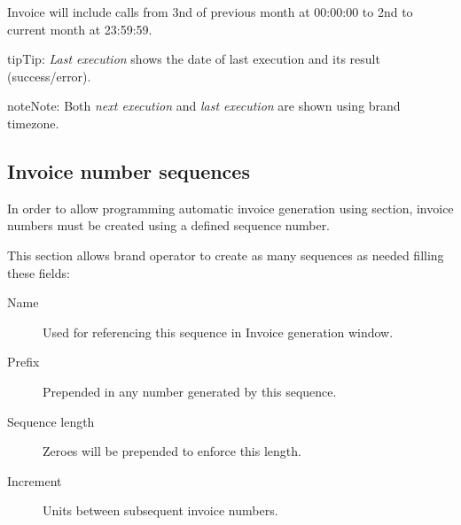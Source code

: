 \documentclass[letterpaper,10pt,english]{sphinxmanual}
\begin{document}
Invoice will include calls from 3nd of previous month at 00:00:00 to 2nd to current month at 23:59:59.

\begin{notice}{tip}{Tip:}
\emph{Last execution} shows the date of last execution and its result (success/error).
\end{notice}

\begin{notice}{note}{Note:}
Both \emph{next execution} and \emph{last execution} are shown using brand timezone.
\end{notice}


\subsection{Invoice number sequences}
\label{administration_portal/brand/invoicing/invoice_number_sequences:invoice-number-sequences}\label{administration_portal/brand/invoicing/invoice_number_sequences::doc}
In order to allow programming automatic invoice generation using {\hyperref[administration_portal/brand/invoicing/invoice_schedulers:invoice\string-schedulers]{}} section, invoice
numbers must be created using a defined sequence number.

This section allows brand operator to create as many sequences as needed filling these fields:
\begin{description}
\item[{Name}] \leavevmode{}\label{administration_portal/brand/invoicing/invoice_number_sequences:term-name}
Used for referencing this sequence in Invoice generation window.

\item[{Prefix}] \leavevmode{}\label{administration_portal/brand/invoicing/invoice_number_sequences:term-prefix}
Prepended in any number generated by this sequence.

\item[{Sequence length}] \leavevmode{}\label{administration_portal/brand/invoicing/invoice_number_sequences:term-sequence-length}
Zeroes will be prepended to enforce this length.

\item[{Increment}] \leavevmode{}\label{administration_portal/brand/invoicing/invoice_number_sequences:term-increment}
Units between subsequent invoice numbers.

\end{description}
\end{document}
